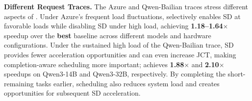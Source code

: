 \textbf{Different Request Traces.}
The Azure and Qwen-Bailian traces %
stress different aspects of \sysname.
Under Azure's frequent load fluctuations, \sysname selectively enables SD at favorable loads while disabling SD under high load, achieving \textbf{1.18--1.64$\times$} speedup over the {\bf best} baseline across different models and hardware configurations. %
Under the sustained high load of the Qwen-Bailian trace, SD provides fewer acceleration opportunities and can even increase JCT, making completion-aware scheduling more important;
\sysname achieves \textbf{1.88$\times$} and \textbf{2.10$\times$} speedups on Qwen3-14B and Qwen3-32B, respectively. By completing the short-remaining tasks earlier, scheduling also reduces system load and creates opportunities for subsequent SD acceleration.



